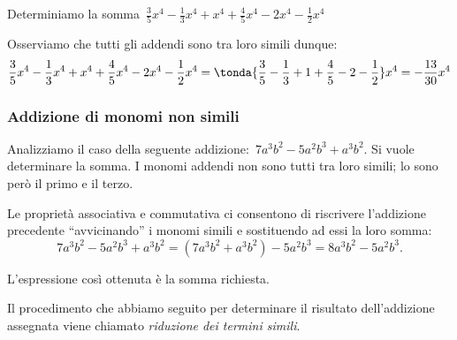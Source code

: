 % 
% 
% 
% 

 \begin{esempio}
Determiniamo la 
somma~\(\frac{3}{5}x^{4}-\frac{1}{3}x^{4}+x^{4}+\frac{4}{5}x^{4}-2x^{4}-\frac
{1}{2}x^{4}\)

Osserviamo che tutti gli addendi sono tra loro simili dunque:
\[\frac{3}{5}x^{4}-\frac{1}{3}x^{4}+x^{4}+\frac{4}{5}x^{4}-2x^{4}-\frac{1}{2
}x^{4}=\tonda{\frac{3}{5}-\frac{1}{3}+1+\frac{4}{5}-2-\frac{1}{2}}x^{4}
=-{\frac{13}{30}}x^{4}\]
\end{esempio}

\subsubsection{Addizione di monomi non simili}

Analizziamo il caso della seguente
addizione:~\(7a^{3}b^{2}-5a^{2}b^{3}+a^{3}b^{2}\). Si vuole determinare
la somma. I monomi addendi non sono tutti tra loro simili; lo sono
però il primo e il terzo.

Le proprietà associativa e commutativa ci consentono di riscrivere
l'addizione precedente ``avvicinando'' i monomi simili e
sostituendo ad essi la loro somma:
\[7a^{3}b^{2}-5a^{2}b^{3}+a^{3}b^{2}=(7a^{3}b^{2}+a^{3}b^{2})-5a^{2}b^{3}
=8a^{3}b^{2}-5a^{2}b^{3}.\]

L'espressione così ottenuta è la somma richiesta.


Il procedimento che abbiamo seguito per determinare il risultato
dell'addizione assegnata viene chiamato
\emph{riduzione dei termini simili}.

